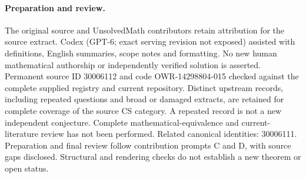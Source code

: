\documentclass[11pt]{article}
\begin{document}
\paragraph{Preparation and review.}
The original source and UnsolvedMath contributors retain attribution for the source extract. Codex (GPT-6; exact serving revision not exposed) assisted with definitions, English summaries, scope notes and formatting. No new human mathematical authorship or independently verified solution is asserted. Permanent source ID 30006112 and code OWR-14298804-015 checked against the complete supplied registry and current repository. Distinct upstream records, including repeated questions and broad or damaged extracts, are retained for complete coverage of the source CS category. A repeated record is not a new independent conjecture. Complete mathematical-equivalence and current-literature review has not been performed. Related canonical identities: 30006111. Preparation and final review follow contribution prompts C and D, with source gaps disclosed. Structural and rendering checks do not establish a new theorem or open status.
\label{end:30006112}
\end{document}
